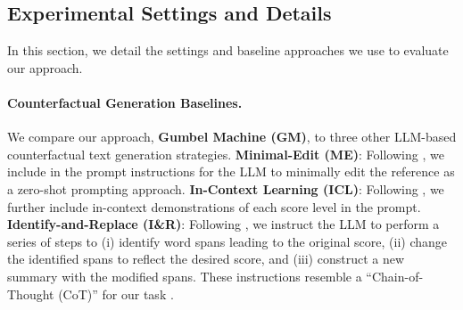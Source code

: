 \documentclass[11pt]{article}
\begin{document}
\subsection{Experimental Settings and Details}

In this section, we detail the settings and baseline approaches we use to evaluate our approach.

\paragraph{Counterfactual Generation Baselines.}

We compare our approach, \textbf{Gumbel Machine (GM)}, to three other LLM-based counterfactual text generation strategies.
%
\textbf{Minimal-Edit (ME)}: Following \citet{gat_faithful_2023}, we include in the prompt instructions for the LLM to minimally edit the reference as a zero-shot prompting approach.
\textbf{In-Context Learning (ICL)}: Following \citet{li_prompting_2024}, we further include in-context demonstrations of each score level in the prompt.
\textbf{Identify-and-Replace (I\&R)}: Following \citet{nguyen_llms_2024}, we instruct the LLM to perform a series of steps to (i) identify word spans leading to the original score, (ii) change the identified spans to reflect the desired score, and (iii) construct a new summary with the modified spans. These instructions resemble a ``Chain-of-Thought (CoT)'' for our task \cite{wei2022chain}.

\end{document}
